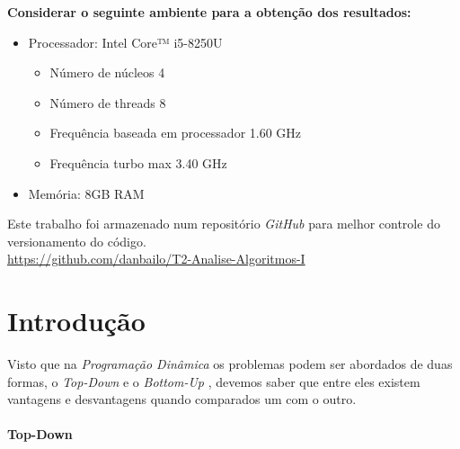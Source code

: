 \documentclass[a4paper, 12pt]{article}
\begin{document}
{\bf Considerar o seguinte ambiente para a obtenção dos resultados:}
\begin{itemize}
    \item Processador: Intel Core™ i5-8250U
    \begin{itemize}
        \item Número de núcleos 4
        \item Número de threads 8
        \item Frequência baseada em processador 1.60 GHz
        \item Frequência turbo max 3.40 GHz
    \end{itemize}
    \item Memória: 8GB RAM
\end{itemize}
Este trabalho foi armazenado num repositório {\it GitHub} para melhor controle do versionamento do código.\\
\url{https://github.com/danbailo/T2-Analise-Algoritmos-I}
\clearpage



\section{Introdução}\label{sec:introducao}
Visto que na {\it Programação Dinâmica} os problemas podem ser abordados de duas formas, o {\it Top-Down} e o {\it Bottom-Up}
, devemos saber que entre eles existem vantagens e desvantagens quando comparados um com o outro.\\~\\
{\bf Top-Down}
\end{document}
